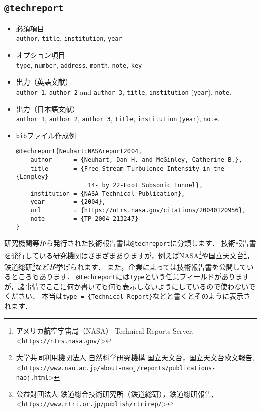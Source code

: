 \documentclass[a4paper,fleqn,uplatex,dvipdfmx]{jsarticle}
\makeatletter
\newcommand{\tttechreport}{\texttt{@techreport}}
\makeatother
\begin{document}
\subsection{\tttechreport}
\label{ssec:techreport}
\begin{screen}
    \begin{itemize}
        \item 必須項目 \\
        \verb|author|, \verb|title|, \verb|institution|, \verb|year|
        \item オプション項目 \\
        \verb|type|, \verb|number|, \verb|address|, \verb|month|, \verb|note|, \verb|key|
        \item 出力（英語文献） \\
            \colorbox[gray]{0.8}{\texttt{author 1}}, \colorbox[gray]{0.8}{\texttt{author 2}} and \colorbox[gray]{0.8}{\texttt{author 3}}, \colorbox[gray]{0.8}{\texttt{title}}, \colorbox[gray]{0.8}{\texttt{institution}} (\colorbox[gray]{0.8}{\texttt{year}}), \colorbox[gray]{0.8}{\texttt{note}}.
        \item 出力（日本語文献） \\
            \colorbox[gray]{0.8}{\texttt{author 1}}, \colorbox[gray]{0.8}{\texttt{author 2}}, \colorbox[gray]{0.8}{\texttt{author 3}}, \colorbox[gray]{0.8}{\texttt{title}}, \colorbox[gray]{0.8}{\texttt{institution}} (\colorbox[gray]{0.8}{\texttt{year}}), \colorbox[gray]{0.8}{\texttt{note}}.
        \item \verb|bib|ファイル作成例 \vspace{-3mm}
\begin{verbatim}
@techreport{Neuhart:NASAreport2004,
    author      = {Neuhart, Dan H. and McGinley, Catherine B.},
    title       = {Free-Stream Turbulence Intensity in the {Langley} 
                    14- by 22-Foot Subsonic Tunnel},
    institution = {NASA Technical Publication},
    year        = {2004},
    url         = {https://ntrs.nasa.gov/citations/20040120956},
    note        = {TP-2004-213247}
}
\end{verbatim}
    \end{itemize}
\end{screen}

研究機関等から発行された技術報告書は\tttechreport に分類します．
技術報告書を発行している研究機関はさまざまありますが，例えばNASA\footnote{アメリカ航空宇宙局（NASA） Technical Reports Server, \textless\verb|https://ntrs.nasa.gov/|\textgreater}や国立天文台\footnote{大学共同利用機関法人 自然科学研究機構 国立天文台，国立天文台欧文報告, \textless\verb|https://www.nao.ac.jp/about-naoj/reports/publications-naoj.html|\textgreater}，鉄道総研\footnote{公益財団法人 鉄道総合技術研究所（鉄道総研），鉄道総研報告, \textless\verb|https://www.rtri.or.jp/publish/rtrirep/|\textgreater}などが挙げられます．
また，企業によっては技術報告書を公開しているところもあります．
\tttechreport には\verb|type|という任意フィールドがありますが，諸事情でここに何か書いても何も表示しないようにしているので使わないでください．
本当は\verb|type = {Technical Report}|などと書くとそのように表示されます．
\end{document}
